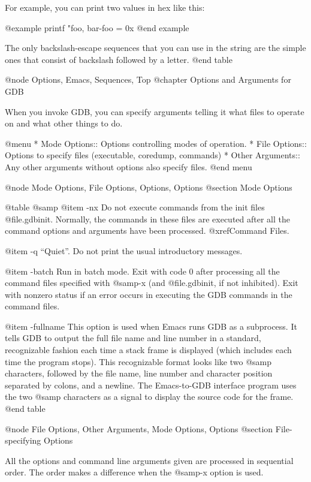 For example, you can print two values in hex like this:

@example
printf "foo, bar-foo = 0x%
@end example

The only backslash-escape sequences that you can use in the string are
the simple ones that consist of backslash followed by a letter.
@end table

@node Options, Emacs, Sequences, Top
@chapter Options and Arguments for GDB

When you invoke GDB, you can specify arguments telling it what files to
operate on and what other things to do.

@menu
* Mode Options::     Options controlling modes of operation.
* File Options::     Options to specify files (executable, coredump, commands)
* Other Arguments::  Any other arguments without options
			also specify files.
@end menu

@node Mode Options, File Options, Options, Options
@section Mode Options

@table @samp
@item -nx
Do not execute commands from the init files @file{.gdbinit}.
Normally, the commands in these files are executed after all the
command options and arguments have been processed.  @xref{Command
Files}.

@item -q
``Quiet''.  Do not print the usual introductory messages.

@item -batch
Run in batch mode.  Exit with code 0 after processing all the command
files specified with @samp{-x} (and @file{.gdbinit}, if not inhibited).
Exit with nonzero status if an error occurs in executing the GDB
commands in the command files.

@item -fullname
This option is used when Emacs runs GDB as a subprocess.  It tells GDB
to output the full file name and line number in a standard,
recognizable fashion each time a stack frame is displayed (which
includes each time the program stops).  This recognizable format looks
like two @samp{} characters, followed by the file name, line number
and character position separated by colons, and a newline.  The
Emacs-to-GDB interface program uses the two @samp{} characters as
a signal to display the source code for the frame.
@end table

@node File Options, Other Arguments, Mode Options, Options
@section File-specifying Options

All the options and command line arguments given are processed
in sequential order.  The order makes a difference when the
@samp{-x} option is used.


